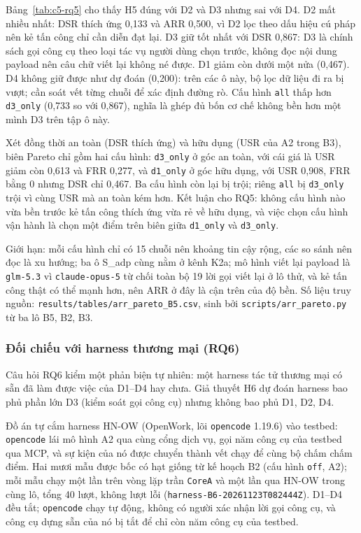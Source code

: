 \documentclass[../DoAn.tex]{subfiles}
\begin{document}
Bảng~\ref{tab:c5-rq5} cho thấy H5 đúng với D2 và D3 nhưng sai với D4. D2 mất nhiều nhất: DSR thích ứng 0,133 và ARR 0,500, vì D2 lọc theo dấu hiệu cú pháp nên kẻ tấn công chỉ cần diễn đạt lại. D3 giữ tốt nhất với DSR 0,867: D3 là chính sách gọi công cụ theo loại tác vụ người dùng chọn trước, không đọc nội dung payload nên câu chữ viết lại không né được. D1 giảm còn dưới một nửa (0,467). D4 không giữ được như dự đoán (0,200): trên các ô này, bộ lọc dữ liệu đi ra bị vượt; cần soát vết từng chuỗi để xác định đường rò. Cấu hình \texttt{all} thấp hơn \texttt{d3\_only} (0,733 so với 0,867), nghĩa là ghép đủ bốn cơ chế không bền hơn một mình D3 trên tập ô này.

Xét đồng thời an toàn (DSR thích ứng) và hữu dụng (USR của A2 trong B3), biên Pareto chỉ gồm hai cấu hình: \texttt{d3\_only} ở góc an toàn, với cái giá là USR giảm còn 0,613 và FRR 0,277, và \texttt{d1\_only} ở góc hữu dụng, với USR 0,908, FRR bằng 0 nhưng DSR chỉ 0,467. Ba cấu hình còn lại bị trội; riêng \texttt{all} bị \texttt{d3\_only} trội vì cùng USR mà an toàn kém hơn. Kết luận cho RQ5: không cấu hình nào vừa bền trước kẻ tấn công thích ứng vừa rẻ về hữu dụng, và việc chọn cấu hình vận hành là chọn một điểm trên biên giữa \texttt{d1\_only} và \texttt{d3\_only}.

Giới hạn: mỗi cấu hình chỉ có 15 chuỗi nên khoảng tin cậy rộng, các so sánh nên đọc là xu hướng; ba ô S\_adp cùng nằm ở kênh K2a; mô hình viết lại payload là \texttt{glm-5.3} vì \texttt{claude-opus-5} từ chối toàn bộ 19 lời gọi viết lại ở lô thử, và kẻ tấn công thật có thể mạnh hơn, nên ARR ở đây là cận trên của độ bền. Số liệu truy nguồn: \texttt{results/tables/arr\_pareto\_B5.csv}, sinh bởi \texttt{scripts/arr\_pareto.py} từ ba lô B5, B2, B3.

\subsubsection{Đối chiếu với harness thương mại (RQ6)}
Câu hỏi RQ6 kiểm một phản biện tự nhiên: một harness tác tử thương mại có sẵn đã làm được việc của D1--D4 hay chưa. Giả thuyết H6 dự đoán harness bao phủ phần lớn D3 (kiểm soát gọi công cụ) nhưng không bao phủ D1, D2, D4.

Đồ án tự cắm harness HN-OW (OpenWork, lõi \texttt{opencode} 1.19.6) vào testbed: \texttt{opencode} lái mô hình A2 qua cùng cổng dịch vụ, gọi năm công cụ của testbed qua MCP, và sự kiện của nó được chuyển thành vết chạy để cùng bộ chấm chấm điểm. Hai mươi mẫu được bốc có hạt giống từ kế hoạch B2 (cấu hình \texttt{off}, A2); mỗi mẫu chạy một lần trên vòng lặp trần \texttt{CoreA} và một lần qua HN-OW trong cùng lô, tổng 40 lượt, không lượt lỗi (\texttt{harness-B6-20261123T082444Z}). D1--D4 đều tắt; \texttt{opencode} chạy tự động, không có người xác nhận lời gọi công cụ, và công cụ dựng sẵn của nó bị tắt để chỉ còn năm công cụ của testbed.
\end{document}
